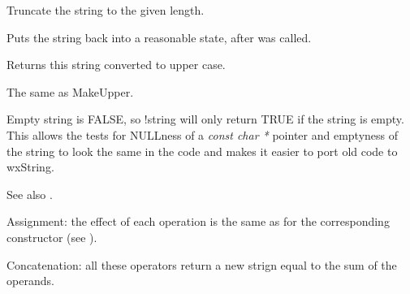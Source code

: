 {\label{wxstringtruncate}


Truncate the string to the given length.

\label{wxstringungetwritebuf}


Puts the string back into a reasonable state, after
\rtfsp{} was called.

\label{wxstringupper}


Returns this string converted to upper case.

\label{wxstringuppercase}


The same as MakeUpper.

\label{wxstringoperatornot}


Empty string is FALSE, so !string will only return TRUE if the string is empty.
This allows the tests for NULLness of a {\it const char *} pointer and emptyness
of the string to look the same in the code and makes it easier to port old code
to wxString.

See also .

\label{wxstringoperatorassign}






Assignment: the effect of each operation is the same as for the corresponding
constructor (see ).

\label{wxstringoperatorplus}

Concatenation: all these operators return a new strign equal to the sum of the
operands.

}
